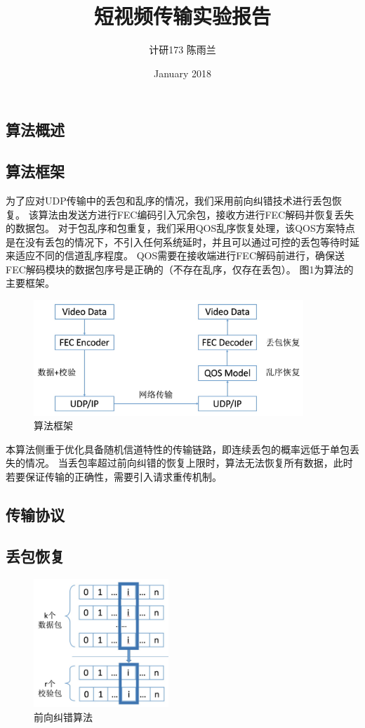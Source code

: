 \documentclass[onecolumn]{article}
\title{短视频传输实验报告}
\author{计研173 \quad 陈雨兰 \quad 2017310787}
\date{January 2018}
\begin{document}
\begin{CJK*}{UTF8}{gbsn}

\maketitle

\section{算法概述}
\subsection{算法框架}
为了应对UDP传输中的丢包和乱序的情况，我们采用前向纠错技术进行丢包恢复。
该算法由发送方进行FEC编码引入冗余包，接收方进行FEC解码并恢复丢失的数据包。
对于包乱序和包重复，我们采用QOS乱序恢复处理，该QOS方案特点是在没有丢包的情况下，不引入任何系统延时，并且可以通过可控的丢包等待时延来适应不同的信道乱序程度。
QOS需要在接收端进行FEC解码前进行，确保送FEC解码模块的数据包序号是正确的（不存在乱序，仅存在丢包）。
图1为算法的主要框架。

\begin{figure}[h]
	\centering
	\includegraphics[width=4in]{frame.jpg}
	\caption{算法框架}
	\label{fig:frame}
\end{figure}

本算法侧重于优化具备随机信道特性的传输链路，即连续丢包的概率远低于单包丢失的情况。
当丢包率超过前向纠错的恢复上限时，算法无法恢复所有数据，此时若要保证传输的正确性，需要引入请求重传机制。

\subsection{传输协议}

\subsection{丢包恢复}
\begin{figure}[h]
	\centering
	\includegraphics[width=2in]{FEC.jpg}
	\caption{前向纠错算法}
	\label{fig:FEC}
\end{figure}


\end{CJK*}
\end{document}
